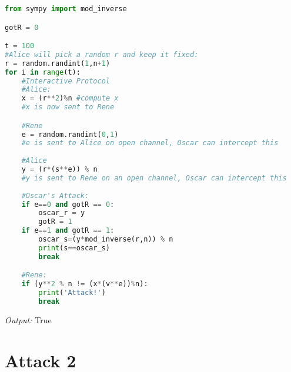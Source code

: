 \begin{lstlisting}[language=Python]
from sympy import mod_inverse

gotR = 0

t = 100
#Alice will pick a random r and keep it fixed:
r = random.randint(1,n+1)
for i in range(t):
	#Interactive Protocol
	#Alice:
	x = (r**2)%n #compute x
	#x is now sent to Rene

	#Rene
	e = random.randint(0,1)
	#e is sent to Alice on open channel, Oscar can intercept this
	
	#Alice
	y = (r*(s**e)) % n
	#y is sent to Rene on an open channel, Oscar can intercept this
	
	#Oscar's Attack:
	if e==0 and gotR == 0:
		oscar_r = y
		gotR = 1
	if e==1 and gotR == 1:
		oscar_s=(y*mod_inverse(r,n)) % n
		print(s==oscar_s)
		break

	#Rene:
	if (y**2 % n != (x*(v**e))%n):
		print('Attack!')
		break
\end{lstlisting}
\textit{Output:} True

\section{Attack 2}